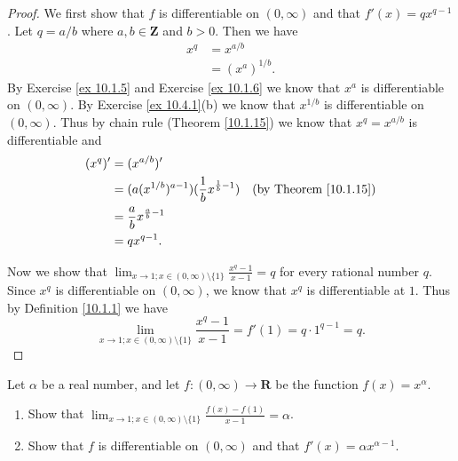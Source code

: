 \begin{proof}
    We first show that \(f\) is differentiable on \((0, \infty)\) and that \(f'(x) = q x^{q - 1}\).
    Let \(q = a / b\) where \(a, b \in \mathbf{Z}\) and \(b > 0\).
    Then we have
    \begin{align*}
        x^q & = x^{a / b}      \\
            & = (x^a)^{1 / b}.
    \end{align*}
    By Exercise \ref{ex 10.1.5} and Exercise \ref{ex 10.1.6} we know that \(x^a\) is differentiable on \((0, \infty)\).
    By Exercise \ref{ex 10.4.1}(b) we know that \(x^{1 / b}\) is differentiable on \((0, \infty)\).
    Thus by chain rule (Theorem \ref{10.1.15}) we know that \(x^q = x^{a / b}\) is differentiable and
    \begin{align*}
        (x^q)' & = (x^{a / b})'                                                                                 \\
               & = (a(x^{1 / b})^{a - 1}) (\frac{1}{b} x^{\frac{1}{b} - 1}) & \text{(by Theorem \ref{10.1.15})} \\
               & = \frac{a}{b} x^{\frac{a}{b} - 1}                                                              \\
               & = q x^{q - 1}.
    \end{align*}

    Now we show that \(\lim_{x \to 1 ; x \in (0, \infty) \setminus \{1\}} \frac{x^q - 1}{x - 1} = q\) for every rational number \(q\).
    Since \(x^q\) is differentiable on \((0, \infty)\), we know that \(x^q\) is differentiable at \(1\).
    Thus by Definition \ref{10.1.1} we have
    \[
        \lim_{x \to 1 ; x \in (0, \infty) \setminus \{1\}} \frac{x^q - 1}{x - 1} = f'(1) = q \cdot 1^{q - 1} = q.
    \]
\end{proof}

\begin{exercise}\label{ex 10.4.3}
    Let \(\alpha\) be a real number, and let \(f : (0, \infty) \to \mathbf{R}\) be the function \(f(x) = x^{\alpha}\).
    \begin{enumerate}
        \item Show that \(\lim_{x \to 1 ; x \in (0, \infty) \setminus \{1\}} \frac{f(x) - f(1)}{x - 1} = \alpha\).
        \item Show that \(f\) is differentiable on \((0, \infty)\) and that \(f'(x) = \alpha x^{\alpha - 1}\).
    \end{enumerate}
\end{exercise}